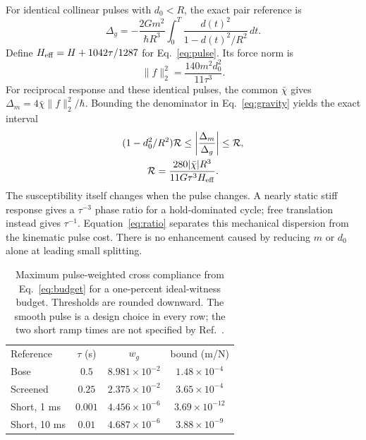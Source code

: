 \documentclass[aps,pra,reprint,amsmath,amssymb,longbibliography,floatfix]{revtex4-2}
\newcommand{\norm}[1]{\lVert#1\rVert}
\begin{document}
For identical collinear pulses with $d_0<R$, the exact pair reference is
\begin{equation}
\Delta_g=-\frac{2Gm^2}{\hbar R^3}\int_0^T\frac{d(t)^2}{1-d(t)^2/R^2}\,dt.
\label{eq:gravity}
\end{equation}
Define $H_{\rm eff}=H+1042\tau/1287$ for Eq.~\eqref{eq:pulse}. Its force norm is
\begin{equation}
\norm f_2^2=\frac{140m^2d_0^2}{11\tau^3}.
\label{eq:forcenorm}
\end{equation}
For reciprocal response and these identical pulses, the common $\bar\chi$ gives $\Delta_m=4\bar\chi\norm f_2^2/\hbar$. Bounding the denominator in Eq.~\eqref{eq:gravity} yields the exact interval
\begin{equation}
\begin{gathered}
(1-d_0^2/R^2)\mathcal R\le\left|\frac{\Delta_m}{\Delta_g}\right|\le\mathcal R,\\
\mathcal R=\frac{280|\bar\chi|R^3}{11G\tau^3 H_{\rm eff}}.
\end{gathered}
\label{eq:ratio}
\end{equation}
The susceptibility itself changes when the pulse changes. A nearly static stiff response gives a $\tau^{-3}$ phase ratio for a hold-dominated cycle; free translation instead gives $\tau^{-1}$. Equation~\eqref{eq:ratio} separates this mechanical dispersion from the kinematic pulse cost. There is no enhancement caused by reducing $m$ or $d_0$ alone at leading small splitting.

\begin{table}[t]
\caption{Maximum pulse-weighted cross compliance from Eq.~\eqref{eq:budget} for a one-percent ideal-witness budget. Thresholds are rounded downward. The smooth pulse is a design choice in every row; the two short ramp times are not specified by Ref.~\cite{Williams}.}
\label{tab:budget}
\begin{ruledtabular}
\begin{tabular}{lccc}
Reference & $\tau$ (s) & $w_g$ & bound (m/N)\\
Bose \cite{Bose} & $0.5$ & $8.981\times10^{-2}$ & $1.48\times10^{-4}$\\
Screened \cite{Schut} & $0.25$ & $2.375\times10^{-2}$ & $3.65\times10^{-4}$\\
Short, 1 ms & $0.001$ & $4.456\times10^{-6}$ & $3.69\times10^{-12}$\\
Short, 10 ms & $0.01$ & $4.687\times10^{-6}$ & $3.88\times10^{-9}$
\end{tabular}
\end{ruledtabular}
\end{table}
\end{document}
